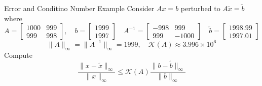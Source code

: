 \documentclass[9pt, serif]{beamer}
\newcommand{\norm}[1]{\lVert#1\rVert}
\begin{document}
\begin{frame}{Error and Conditino Number Example}
    Consider $Ax = b$ perturbed to $A\tilde{x} = \tilde{b}$ where 
    $$A = \begin{bmatrix} 1000 & 999\\999 & 998\end{bmatrix}, \quad b = \begin{bmatrix} 1999\\1997\end{bmatrix} \quad A^{-1} = \begin{bmatrix} -998 & 999\\999 & -1000\end{bmatrix} \quad \tilde{b}=\begin{bmatrix} 1998.99\\1997.01\end{bmatrix}$$
    $$\norm{A}_\infty = \norm{A^{-1}}_\infty = 1999, \quad \mathcal{K}(A) \approx 3.996 \times 10^6$$
    \pause
    Compute $$\frac{\norm{x-\tilde{x}}_\infty}{\norm{x}_\infty} \le \mathcal{K}(A)\frac{\norm{b-\tilde{b}}_\infty}{\norm{b}_\infty}$$
\end{frame}
\end{document}
